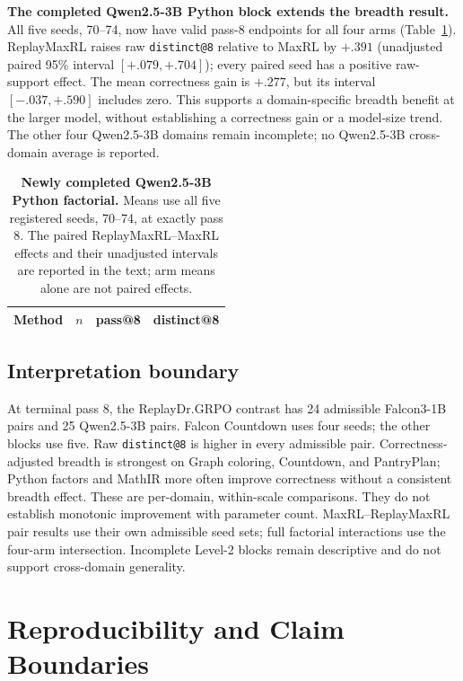 \textbf{The completed Qwen2.5-3B Python block extends the breadth result.}
All five seeds, 70--74, now have valid pass-8 endpoints for all four arms
(Table~\ref{tab:qwen3b-python-factorial}). ReplayMaxRL raises raw
\texttt{distinct@8} relative to MaxRL by \(+.391\)
(unadjusted paired 95\% interval \([+.079,+.704]\)); every paired seed has a
positive raw-support effect. The mean correctness gain is \(+.277\), but its
interval \([-.037,+.590]\) includes zero. This supports a domain-specific
breadth benefit at the larger model, without establishing a correctness gain
or a model-size trend. The other four Qwen2.5-3B domains remain incomplete;
no Qwen2.5-3B cross-domain average is reported.

\begin{table}[H]
  \centering
  \caption{\textbf{Newly completed Qwen2.5-3B Python factorial.}
  Means use all five registered seeds, 70--74, at exactly pass 8.
  The paired ReplayMaxRL--MaxRL effects and their unadjusted intervals are
  reported in the text; arm means alone are not paired effects.}
  \label{tab:qwen3b-python-factorial}
  \small
  \begin{tabular}{@{}lrrr@{}}
    \toprule
    \textbf{Method} & \(n\) & \textbf{pass@8} & \textbf{distinct@8} \\
    \midrule
    
  \end{tabular}
\end{table}

\subsection{Interpretation boundary}
\label{app:scale-boundary}

At terminal pass 8, the ReplayDr.GRPO contrast has 24 admissible Falcon3-1B
pairs and 25 Qwen2.5-3B pairs. Falcon Countdown uses four seeds; the other
blocks use five. Raw \texttt{distinct@8} is higher in every admissible pair. Correctness-adjusted
breadth is strongest on Graph coloring, Countdown, and PantryPlan; Python
factors and MathIR more often improve correctness without a consistent breadth effect. These are per-domain,
within-scale comparisons. They do not establish monotonic improvement with
parameter count. MaxRL--ReplayMaxRL pair results use their own admissible seed sets;
full factorial interactions use the four-arm intersection. Incomplete Level-2
blocks remain descriptive and do not support cross-domain generality.

\section{Reproducibility and Claim Boundaries}
\label{app:reproducibility}

